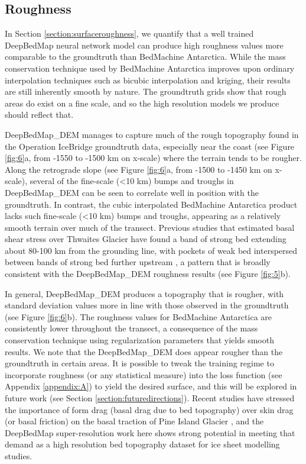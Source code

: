 \documentclass[tc, manuscript]{copernicus}
\begin{document}
\subsection{Roughness}

In Section \ref{section:surfaceroughness}, we quantify that a well trained DeepBedMap neural network model can produce high roughness values more comparable to the groundtruth than BedMachine Antarctica.
While the mass conservation technique used by BedMachine Antarctica \citep{MorlighemDeepglacialtroughs2019} improves upon ordinary interpolation techniques such as bicubic interpolation and kriging, their results are still inherently smooth by nature.
The groundtruth grids show that rough areas do exist on a fine scale, and so the high resolution models we produce should reflect that.

DeepBedMap\_DEM manages to capture much of the rough topography found in the Operation IceBridge groundtruth data, especially near the coast (see Figure \ref{fig:6}a, from -1550 to -1500 km on x-scale) where the terrain tends to be rougher.
Along the retrograde slope (see Figure \ref{fig:6}a, from -1500 to -1450 km on x-scale), several of the fine-scale (<10 km) bumps and troughs in DeepBedMap\_DEM can be seen to correlate well in position with the groundtruth.
In contrast, the cubic interpolated BedMachine Antarctica product lacks such fine-scale (<10 km) bumps and troughs, appearing as a relatively smooth terrain over much of the transect.
Previous studies that estimated basal shear stress over Thwaites Glacier have found a band of strong bed extending about 80-100 km from the grounding line, with pockets of weak bed interspersed between bands of strong bed further upstream \citep{JoughinBasalconditionsPine2009,SergienkoRegularPatternsFrictional2013}, a pattern that is broadly consistent with the DeepBedMap\_DEM roughness results (see Figure \ref{fig:5}b).

In general, DeepBedMap\_DEM produces a topography that is rougher, with standard deviation values more in line with those observed in the groundtruth (see Figure \ref{fig:6}b).
The roughness values for BedMachine Antarctica are consistently lower throughout the transect, a consequence of the mass conservation technique using regularization parameters that yields smooth results.
We note that the DeepBedMap\_DEM does appear rougher than the groundtruth in certain areas.
It is possible to tweak the training regime to incorporate roughness (or any statistical measure) into the loss function (see Appendix \ref{appendix:A}) to yield the desired surface, and this will be explored in future work (see Section \ref{section:futuredirections}).
Recent studies have stressed the importance of form drag (basal drag due to bed topography) over skin drag (or basal friction) on the basal traction of Pine Island Glacier \citep{BinghamDiverselandscapesPine2017,Kyrke-SmithRelevanceDetailBasal2018}, and the DeepBedMap super-resolution work here shows strong potential in meeting that demand as a high resolution bed topography dataset for ice sheet modelling studies.
\end{document}

